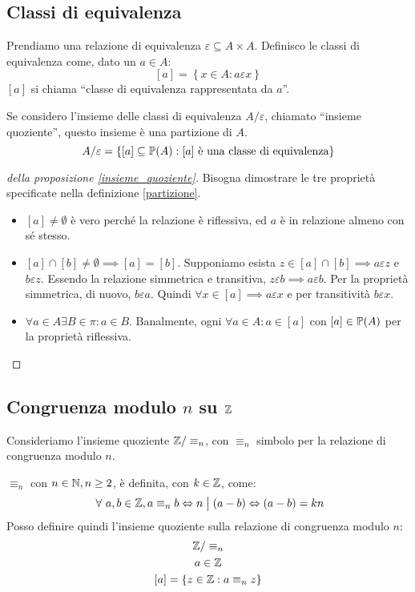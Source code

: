 \subsection{Classi di equivalenza}
\begin{defn}
Prendiamo una relazione di equivalenza $\varepsilon \subseteq A \times A$. Definisco le classi di equivalenza come, dato un $a \in A$:
\[
[a] = \left \{ x \in A : a \varepsilon x \right\}
\]
$[a]$ si chiama ``classe di equivalenza rappresentata da $a$''.
\end{defn}
\begin{prop}
Se considero l'insieme delle classi di equivalenza $A / \varepsilon$, chiamato ``insieme quoziente'', questo insieme \`e una partizione di $A$.
\[
A/\varepsilon = \left\{ [a] \subseteq \mathbb{P}(A) : [a] \text{ \`e una classe di equivalenza} \right\}
\]
\end{prop}
\begin{proof}[della proposizione \ref{insieme_quoziente}]
Bisogna dimostrare le tre propriet\`a specificate nella definizione \ref{partizione}.
\begin{itemize}
  \item $[a] \neq \emptyset$ \`e vero perch\'e la relazione \`e riflessiva, ed $a$ \`e in relazione almeno con s\'e stesso.
  \item $[a] \cap [b] \neq \emptyset \implies [a] = [b]$. Supponiamo esista $z \in [a] \cap [b] \implies a \varepsilon z$ e $b \varepsilon z$. Essendo la relazione simmetrica e transitiva, $z \varepsilon b \implies a \varepsilon b$. Per la propriet\`a simmetrica, di nuovo, $b \varepsilon a$. Quindi $ \forall x \in [a] \implies a \varepsilon x $ e per transitivit\`a $ b \varepsilon x$.
  \item $\forall a \in A \exists B \in \pi : a \in B$. Banalmente, ogni $\forall a \in A : a \in [a]$ con $[a] \in \mathbb{P}(A)$ per la propriet\`a riflessiva.
\end{itemize}
\end{proof}

\subsection{Congruenza modulo $n$ su $\mathbb{Z}$}

Consideriamo l'insieme quoziente $\mathbb{Z} / \equiv_{n}$, con $\equiv_{n} $ simbolo per la relazione di congruenza modulo $n$.

$\equiv_{n}$ con $n \in \mathbb{N}, n \ge 2$, \`e definita, con $ k \in \mathbb{Z}$, come:
\[
\forall a, b \in \integers, a \equiv_{n} b \iff n \divides (a - b) \iff (a - b) = k n 
\]
Posso definire quindi l'insieme quoziente sulla relazione di congruenza modulo $n$:
\begin{gather*}
\mathbb{Z} / \equiv_{n} \\
a \in \mathbb{Z} \\
[a] = \left \{ z \in \mathbb{Z} : a \equiv_{n} z \right \}
\end{gather*}

